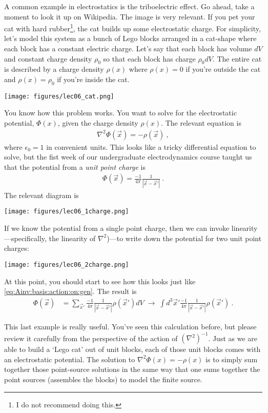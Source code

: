 \begin{example}\label{eq:charged:cat}
A common example in electrostatics is the triboelectric effect. Go ahead, take a moment to look it up on Wikipedia. The image is very relevant. If you pet your cat with hard rubber\footnote{I do not recommend doing this.}, the cat builds up some electrostatic charge. For simplicity, let's model this system as a bunch of Lego blocks arranged in a cat-shape where each block has a constant electric charge. Let's say that each block has volume $dV$ and constant charge density $\rho_0$ so that each block has charge $\rho_0 dV$. The entire cat is described by a charge density $\rho(x)$ where $\rho(x)=0$ if you're outside the cat and $\rho(x)=\rho_0$ if you're inside the cat. 
\begin{center}
\texttt{[image: figures/lec06\_cat.png]}
\end{center}
You know how this problem works. You want to solve for the electrostatic potential, $\Phi(x)$, given the charge density $\rho(x)$. The relevant equation is
\begin{align}
  \nabla^2 \Phi(\vec{x}) = -\rho(\vec{x})\ ,
\end{align}
where $\epsilon_0=1$ in convenient units. This looks like a tricky differential equation to solve, but the fist week of our undergraduate electrodynamics course taught us that the potential from a \emph{unit point charge} is
\begin{align}
  \Phi(\vec{x}) = \frac{-1}{4\pi} \frac{1}{|\vec{x}-\vec{x}'|} \ .
\end{align}
The relevant diagram is
\begin{center}
\texttt{[image: figures/lec06\_1charge.png]}
\end{center}
If we know the potential from a single point charge, then we can invoke linearity---specifically, the linearity of $\nabla^2$)---to write down the potential for two unit point charges: 
\begin{center}
\texttt{[image: figures/lec06\_2charge.png]}
\end{center}
At this point, you should start to see how this looks just like \eqref{eq:Ainv:basis:action:on:gen}. The result is
\begin{align}
  \Phi(\vec{x}) &= 
  \sum_{\vec{x}'} \frac{-1}{4\pi} \frac{1}{|\vec{x}-\vec{x}'|} \rho(\vec{x}') dV
  \;\to \;
 \int d^3\vec{x}' \frac{-1}{4\pi} \frac{1}{|\vec{x}-\vec{x}'|} \rho(\vec{x}')   \ .
 \label{eq:electrostatics:greens:func}
\end{align}
\end{example}
This last example is really useful. You've seen this calculation before, but please review it carefully from the perspective of the action of $(\nabla^2)^{-1}$. Just as we are able to build a `Lego cat' out of unit blocks, each of those unit blocks comes with an electrostatic potential. The solution to $\nabla^2 \Phi(x) = -\rho(x)$ is to simply sum together those point-source solutions in the same way that one sums together the point sources (assembles the blocks) to model the finite source.

